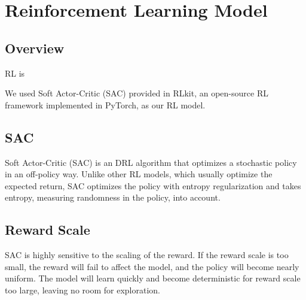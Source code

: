 \section{Reinforcement Learning Model}
\subsection{Overview}
RL is 

We used Soft Actor-Critic (SAC) \cite{haarnoja2018soft} provided in RLkit, an open-source RL framework implemented in PyTorch\cite{pongrlkit}, as our RL model.
\par
\subsection{SAC}
Soft Actor-Critic (SAC) is an DRL algorithm that optimizes a stochastic policy in an off-policy way.
Unlike other RL models, which usually optimize the expected return, SAC optimizes the policy with entropy regularization and takes entropy, measuring randomness in the policy, into account.
\par
\subsection{Reward Scale}
SAC is highly sensitive to the scaling of the reward. If the reward scale is too small, the reward will fail to affect the model, and the policy will become nearly uniform. The model will learn quickly and become deterministic for reward scale too large, leaving no room for exploration.